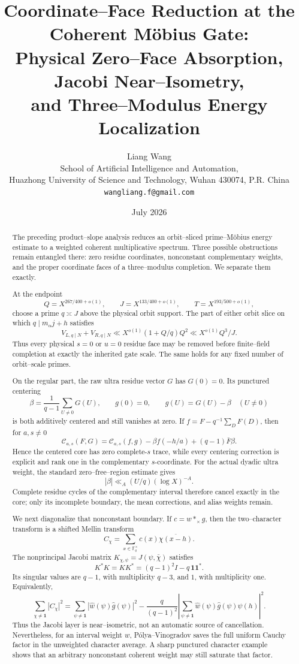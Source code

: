 \documentclass[11pt]{article}
\title{\textbf{Coordinate--Face Reduction at the Coherent M\"obius Gate:}\\
\textbf{Physical Zero--Face Absorption, Jacobi Near--Isometry,}\\
\textbf{and Three--Modulus Energy Localization}}
\author{Liang Wang\\
\small School of Artificial Intelligence and Automation,\\[-0.2em]
\small Huazhong University of Science and Technology, Wuhan 430074, P.R. China\\
\small \texttt{wangliang.f@gmail.com}}
\date{July 2026}
\theoremstyle{definition}
\theoremstyle{remark}
\newcommand{\F}{\mathbb F}
\newcommand{\cC}{\mathcal C}
\begin{document}
\maketitle

\begin{abstract}
The preceding product--slope analysis reduces an orbit--sliced prime--M\"obius
energy estimate to a weighted coherent multiplicative spectrum.  Three
possible obstructions remain entangled there: zero residue coordinates,
nonconstant complementary weights, and the proper coordinate faces of a
three--modulus completion.  We separate them exactly.

At the endpoint
\[
 Q=X^{267/400+o(1)},\qquad
 J=X^{133/400+o(1)},\qquad
 T=X^{193/500+o(1)},
\]
choose a prime \(q\asymp J\) above the physical orbit support.  The part
of either orbit slice on which \(q\mid m_\alpha j+h\) satisfies
\[
 \boxed{
 V_{L,q\mid N}+V_{R,q\mid N}
 \ll X^{o(1)}(1+Q/q)Q^2
 \ll X^{o(1)}Q^3/J.}
\]
Thus every physical \(s=0\) or \(u=0\) residue face may be removed before
finite--field completion at exactly the inherited gate scale.  The same
holds for any fixed number of orbit--scale primes.

On the regular part, the raw ultra residue vector \(G\) has \(G(0)=0\).
Its punctured centering
\[
 \beta=\frac1{q-1}\sum_{U\ne0}G(U),\qquad
 g(0)=0,\qquad g(U)=G(U)-\beta\quad(U\ne0)
\]
is both additively centered and still vanishes at zero.  If
\(f=F-q^{-1}\sum_DF(D)\), then for \(a,s\ne0\)
\[
 \cC_{a,s}(F,G)
 =\cC_{a,s}(f,g)-\beta f(-h/a)+(q-1)\bar F\beta.
\]
Hence the centered core has zero complete-\(s\) trace, while every
centering correction is explicit and rank one in the complementary
\(s\)-coordinate.  For the actual dyadic
ultra weight, the standard zero--free--region estimate gives
\[
 |\beta|\ll_A (U/q)(\log X)^{-A}.
\]
Complete residue cycles of the complementary interval therefore cancel
exactly in the core; only its incomplete boundary, the mean corrections,
and alias weights remain.

We next diagonalize that nonconstant boundary.  If
\(c=w*_\times g\), then the two--character transform is a shifted Mellin
transform
\[
 C_\chi=\sum_{x\in\F_q^\times}c(x)\overline{\chi(x-h)}.
\]
The nonprincipal Jacobi matrix
\(
 K_{\chi,\psi}=J(\psi,\bar\chi)
\)
satisfies
\[
 \boxed{K^*K=KK^*=(q-1)^2I-q\,\mathbf1\mathbf1^*.}
\]
Its singular values are \(q-1\), with multiplicity \(q-3\), and \(1\),
with multiplicity one.  Equivalently,
\[
 \sum_{\chi\ne\mathbf1}|C_\chi|^2
 =\sum_{\psi\ne\mathbf1}
 |\widehat w(\psi)\widehat g(\psi)|^2
 -\frac q{(q-1)^2}
 \left|\sum_{\psi\ne\mathbf1}
 \widehat w(\psi)\widehat g(\psi)\psi(h)\right|^2.
\]
Thus the Jacobi layer is near--isometric, not an automatic source of
cancellation.  Nevertheless, for an interval weight \(w\),
P\'olya--Vinogradov saves the full uniform Cauchy factor in the unweighted
character average.  A sharp punctured character example shows that an
arbitrary nonconstant coherent weight may still saturate that factor.


\end{abstract}
\end{document}
